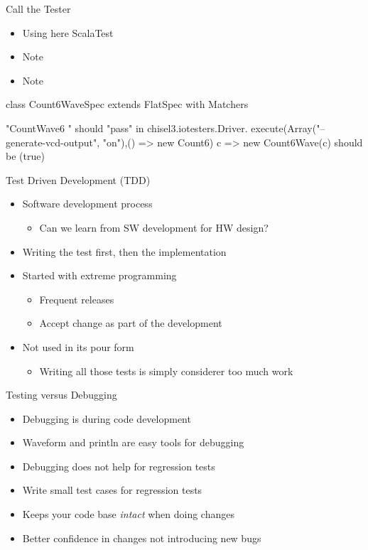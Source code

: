 \begin{frame}[fragile]{Call the Tester}
\begin{itemize}
\item Using here ScalaTest
\item Note 
\item Note 
\end{itemize}
\begin{chisel}
class Count6WaveSpec extends
  FlatSpec with Matchers {
  
  "CountWave6 " should "pass" in {
    chisel3.iotesters.Driver.
    execute(Array("--generate-vcd-output", "on"),() => new Count6)
    { c => new Count6Wave(c) }
    should be (true)
  }
}
\end{chisel}
\end{frame}


\begin{frame}[fragile]{Test Driven Development (TDD)}
\begin{itemize}
\item Software development process
\begin{itemize}
\item Can we learn from SW development for HW design?
\end{itemize}
\item Writing the test first, then the implementation
\item Started with extreme programming
\begin{itemize}
\item Frequent releases
\item Accept change as part of the development
\end{itemize}
\item Not used in its pour form
\begin{itemize}
\item Writing all those tests is simply considerer too much work
\end{itemize}
\end{itemize}
\end{frame}


\begin{frame}[fragile]{Testing versus Debugging}
\begin{itemize}
\item Debugging is during code development
\item Waveform and println are easy tools for debugging
\item Debugging does not help for regression tests
\item Write small test cases for regression tests
\item Keeps your code base \emph{intact} when doing changes
\item Better confidence in changes not introducing new bugs
\end{itemize}
\end{frame}



